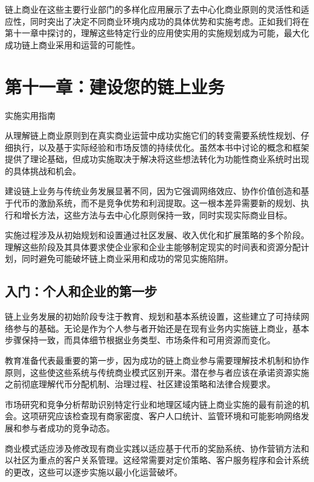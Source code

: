 \documentclass[
  Letterpaper,
]{scrbook}
\begin{document}
链上商业在这些主要行业部门的多样化应用展示了去中心化商业原则的灵活性和适应性，同时突出了决定不同商业环境内成功的具体优势和实施考虑。正如我们将在第十一章中探讨的，理解这些特定行业的应用使实用的实施规划成为可能，最大化成功链上商业采用和运营的可能性。

\chapter{第十一章：建设您的链上业务}\label{sec-building-business}

实施实用指南

从理解链上商业原则到在真实商业运营中成功实施它们的转变需要系统性规划、仔细执行，以及基于实际经验和市场反馈的持续优化。虽然本书中讨论的概念和框架提供了理论基础，但成功实施取决于解决将这些想法转化为功能性商业系统时出现的具体挑战和机会。

建设链上业务与传统业务发展显著不同，因为它强调网络效应、协作价值创造和基于代币的激励系统，而不是竞争优势和利润提取。这一根本差异需要新的规划、执行和增长方法，这些方法与去中心化原则保持一致，同时实现实际商业目标。

实施过程涉及从初始规划和设置通过社区发展、收入优化和扩展策略的多个阶段。理解这些阶段及其具体要求使企业家和企业主能够制定现实的时间表和资源分配计划，同时避免可能破坏链上商业采用和成功的常见实施陷阱。

\section{入门：个人和企业的第一步}\label{ux5165ux95e8ux4e2aux4ebaux548cux4f01ux4e1aux7684ux7b2cux4e00ux6b65}

链上业务发展的初始阶段专注于教育、规划和基本系统设置，这些建立了可持续网络参与的基础。无论是作为个人参与者开始还是在现有业务内实施链上商业，基本步骤保持一致，而具体细节根据业务类型、市场条件和可用资源而变化。

教育准备代表最重要的第一步，因为成功的链上商业参与需要理解技术机制和协作原则，这些使这些系统与传统商业模式区别开来。潜在参与者应该在承诺资源实施之前彻底理解代币分配机制、治理过程、社区建设策略和法律合规要求。

市场研究和竞争分析帮助识别特定行业和地理区域内链上商业实施的最有前途的机会。这项研究应该检查现有商家密度、客户人口统计、监管环境和可能影响网络发展和参与者成功的竞争动态。

商业模式适应涉及修改现有商业实践以适应基于代币的奖励系统、协作营销方法和以社区为重点的客户关系管理。这经常需要对定价策略、客户服务程序和会计系统的更改，这些可以逐步实施以最小化运营破坏。
\end{document}
